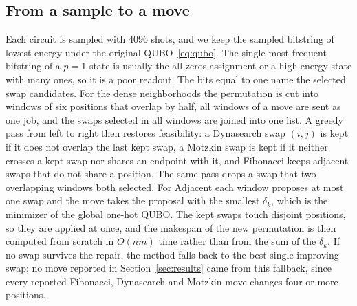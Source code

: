 \documentclass{svproc}
\newcommand{\rev}[1]{{\color{blue}#1}}
\newcommand{\rev}[1]{#1}
\begin{document}
\rev{\subsection{From a sample to a move}
\label{subsec:move}
Each circuit is sampled with 4096 shots, and we keep the sampled bitstring of
lowest energy under the original QUBO~\eqref{eq:qubo}. The single most frequent
bitstring of a $p=1$ state is usually the all-zeros assignment or a
high-energy state with many ones, so it is a poor readout. The bits equal to
one name the selected swap candidates. For the dense neighborhoods the
permutation is cut into windows of six positions that overlap by half, all
windows of a move are sent as one job, and the swaps selected in all windows
are joined into one list. A greedy pass from left to right then restores
feasibility: a Dynasearch swap $(i,j)$ is kept if it does not overlap the last
kept swap, a Motzkin swap is kept if it neither crosses a kept swap nor shares
an endpoint with it, and Fibonacci keeps adjacent swaps that do not share a
position. The same pass drops a swap that two overlapping windows both
selected. For Adjacent each window proposes at most one swap and the move takes
the proposal with the smallest $\delta_k$, which is the minimizer of the global
one-hot QUBO. The kept swaps touch disjoint positions, so they are applied at
once, and the makespan of the new permutation is then computed from scratch in
$O(nm)$ time rather than from the sum of the $\delta_k$. If no swap survives the
repair, the method falls back to the best single improving swap; no move
reported in Section~\ref{sec:results} came from this fallback, since every
reported Fibonacci, Dynasearch and Motzkin move changes four or more positions.}
\end{document}
